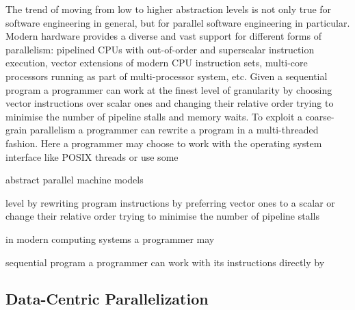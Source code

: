 \documentclass[10pt,a4paper]{report}
\begin{document}
\quad The trend of moving from low to higher abstraction levels is not only true for software engineering in general, but for parallel software engineering in particular. Modern hardware provides a diverse and vast support for different forms of parallelism: pipelined CPUs with out-of-order and superscalar instruction execution, vector extensions of modern CPU instruction sets, multi-core processors running as part of multi-processor system, etc. Given a sequential program a programmer can work at the finest level of granularity by choosing vector instructions over scalar ones and changing their relative order trying to minimise the number of pipeline stalls and memory waits. To exploit a coarse-grain parallelism a programmer can rewrite a program in a multi-threaded fashion. Here a programmer may choose to work with the operating system interface like POSIX threads or use some 

abstract parallel machine models   


level by rewriting program instructions by preferring vector ones to a scalar or change their relative order trying to minimise the number of pipeline stalls    

in modern computing systems a programmer may 

sequential program a programmer can work with its instructions directly by 



\subsection{Data-Centric Parallelization}
\label{chapter_dcp}
\end{document}
